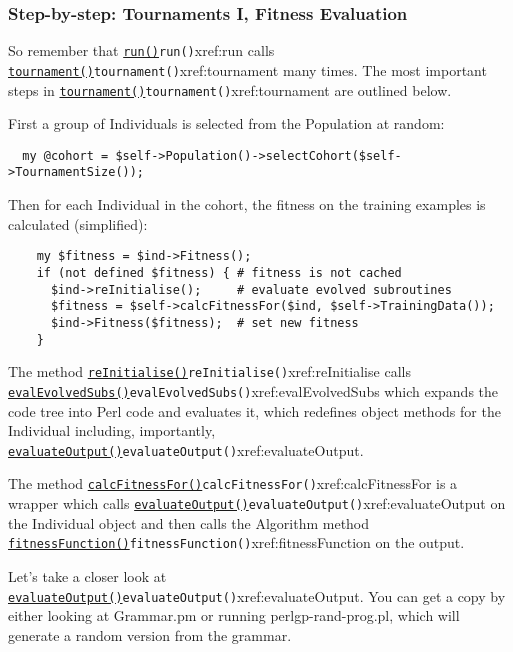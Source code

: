 \documentclass[a4paper]{article}
\begin{document}
\subsubsection{Step-by-step: Tournaments I, Fitness Evaluation}

So remember that \hyperref[no]{\texttt{run()}}{\texttt{run()}}{xref:run} calls \hyperref[no]{\texttt{tournament()}}{\texttt{tournament()}}{xref:tournament} many
times.  The most important steps in \hyperref[no]{\texttt{tournament()}}{\texttt{tournament()}}{xref:tournament} are outlined
below.

First  a group of Individuals is selected from the Population at random:
\begin{verbatim}
  my @cohort = $self->Population()->selectCohort($self->TournamentSize());
\end{verbatim}

Then for each Individual in the cohort, the fitness on the training
examples is calculated (simplified):

\begin{verbatim}
    my $fitness = $ind->Fitness();
    if (not defined $fitness) { # fitness is not cached
      $ind->reInitialise();     # evaluate evolved subroutines
      $fitness = $self->calcFitnessFor($ind, $self->TrainingData());
      $ind->Fitness($fitness);  # set new fitness
    }
\end{verbatim}

The method \hyperref[no]{\texttt{reInitialise()}}{\texttt{reInitialise()}}{xref:reInitialise} calls \hyperref[no]{\texttt{evalEvolvedSubs()}}{\texttt{evalEvolvedSubs()}}{xref:evalEvolvedSubs}
which expands the code tree into Perl code and evaluates it, which
redefines object methods for the Individual including, importantly,
\hyperref[no]{\texttt{evaluateOutput()}}{\texttt{evaluateOutput()}}{xref:evaluateOutput}.

The method \hyperref[no]{\texttt{calcFitnessFor()}}{\texttt{calcFitnessFor()}}{xref:calcFitnessFor} is a wrapper which calls
\hyperref[no]{\texttt{evaluateOutput()}}{\texttt{evaluateOutput()}}{xref:evaluateOutput} on the Individual object and then
calls the Algorithm method \hyperref[no]{\texttt{fitnessFunction()}}{\texttt{fitnessFunction()}}{xref:fitnessFunction} on the
output.

Let's take a closer look at \hyperref[no]{\texttt{evaluateOutput()}}{\texttt{evaluateOutput()}}{xref:evaluateOutput}.  You can get a
copy by either looking at Grammar.pm or running perlgp-rand-prog.pl,
which will generate a random version from the grammar.
\end{document}
